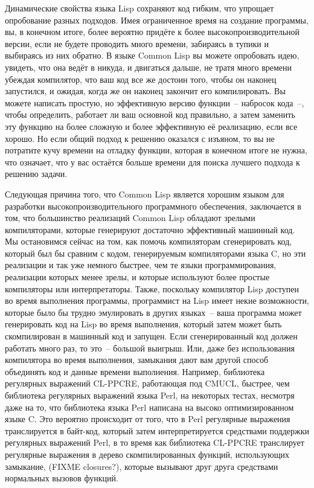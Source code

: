 Динамические свойства языка Lisp сохраняют код гибким, что упрощает опробование разных
подходов. Имея ограниченное время на создание программы, вы, в конечном итоге, более
вероятно придёте к более высокопроизводительной версии, если не будете проводить много
времени, забираясь в тупики и выбираясь из них обратно. В языке Common Lisp вы можете
опробовать идею, увидеть, что она ведёт в никуда, и двигаться дальше, не тратя много
времени убеждая компилятор, что ваш код все же достоин того, чтобы он наконец запустился,
и ожидая, когда же он наконец закончит его компилировать. Вы можете написать простую, но
эффективную версию функции~-- набросок кода~--, чтобы определить, работает ли ваш
основной код правильно, а затем заменить эту функцию на более сложную и более эффективную
её реализацию, если все хорошо. Но если общий подход к решению оказался с изъяном, то вы
не потратите кучу времени на отладку функции, которая в конечном итоге не нужна, что
означает, что у вас остаётся больше времени для поиска лучшего подхода к решению задачи.

Следующая причина того, что Common Lisp является хорошим языком для разработки
высокопроизводительного программного обеспечения, заключается в том, что большинство
реализаций Common Lisp обладают зрелыми компиляторами, которые генерируют достаточно
эффективный машинный код. Мы остановимся сейчас на том, как помочь компиляторам
сгенерировать код, который был бы сравним с кодом, генерируемым компиляторами языка C, но
эти реализации и так уже немного быстрее, чем те языки программирования, реализации
которых менее зрелы, и которые используют более простые компиляторы или
интерпретаторы. Также, поскольку компилятор Lisp доступен во время выполнения программы,
программист на Lisp имеет некие возможности, которые было бы трудно эмулировать в других
языках~-- ваша программа может генерировать код на Lisp во время выполнения, который затем
может быть скомпилирован в машинный код и запущен. Если сгенерированный код должен
работать много раз, то это~-- большой выигрыш. Или, даже без использования компилятора во
время выполнения, замыкания дают вам другой способ объединять код и данные времени
выполнения. Например, библиотека регулярных выражений CL-PPCRE, работающая под CMUCL,
быстрее, чем библиотека регулярных выражений языка Perl, на некоторых тестах, несмотря
даже на то, что библиотека языка Perl написана на высоко оптимизированном языке C. Это
вероятно происходит от того, что в Perl регулярные выражения транслируется в байт-код,
который затем интерпретируется средствами поддержки регулярных выражений Perl, в то время
как библиотека CL-PPCRE транслирует регулярные выражения в дерево скомпилированных
функций, использующих замыкание, (FIXME closures?), которые вызывают друг друга средствами
нормальных вызовов функций.

